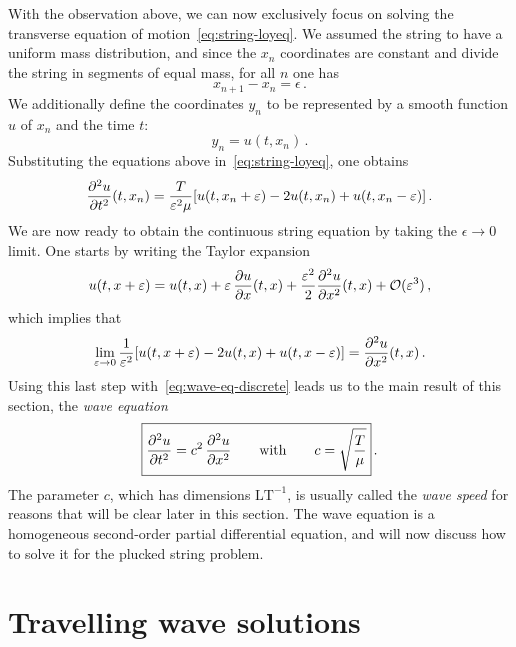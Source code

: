 With the observation above, we can now exclusively focus on solving the transverse
equation of motion~\cref{eq:string-loyeq}. We assumed the string to have a uniform mass
distribution, and since the $x_n$ coordinates are constant and divide the string in
segments of equal mass, for all $n$ one has
\begin{equation}
	x_{n+1}-x_n=\epsilon\,.
\end{equation}
We additionally define the coordinates $y_n$ to be represented by a smooth function $u$ of
$x_n$ and the time $t$:
\begin{equation}
	y_n=u(t,x_n)\,.
\end{equation}
Substituting the equations above in~\cref{eq:string-loyeq}, one obtains
\begin{equation}
	\frac{\partial^{2} u}{\partial t^{2}}(t,x_n)=\frac{T}{\varepsilon^2\mu}
	[u(t,x_{n}+\varepsilon)-2u(t,x_{n})+u(t,x_{n}-\varepsilon)]\,.\label{eq:wave-eq-discrete}
\end{equation}
We are now ready to obtain the continuous string equation by taking the $\epsilon\to 0$
limit. One starts by writing the Taylor expansion
\begin{equation}
	u(t,x+\varepsilon)=u(t,x)+\varepsilon\,\frac{\partial u}{\partial x}(t,x)
	+\frac{\varepsilon^2}{2}\frac{\partial^{2} u}{\partial x^{2}}(t,x)+\mathcal{O}(\varepsilon^3)\,,
\end{equation}
which implies that
\begin{equation}
	\lim_{\varepsilon\to 0}\frac{1}{\varepsilon^2}
	[u(t,x+\varepsilon)-2u(t,x)+u(t,x-\varepsilon)]=\frac{\partial^{2} u}{\partial x^{2}}(t,x)\,.
\end{equation}
Using this last step with~\cref{eq:wave-eq-discrete} leads us to the main result of this
section, the \emph{wave equation}
\begin{equation}
	\boxed{
		\frac{\partial^{2} u}{\partial t^{2}}=c^2\,\frac{\partial^{2} u}{\partial x^{2}}
		\qquad\text{with}\qquad
		c=\sqrt{\frac{T}{\mu}}}\,.
	\label{eq:wave-eq}
\end{equation}
The parameter $c$, which has dimensions $\mathrm{L}\mathrm{T}^{-1}$, is usually called the
\emph{wave speed} for reasons that will be clear later in this section. The wave equation
is a homogeneous second-order partial differential equation, and will now discuss how to
solve it for the plucked string problem.
\section{Travelling wave solutions}
\label{sec:wave-eq-travelling}
